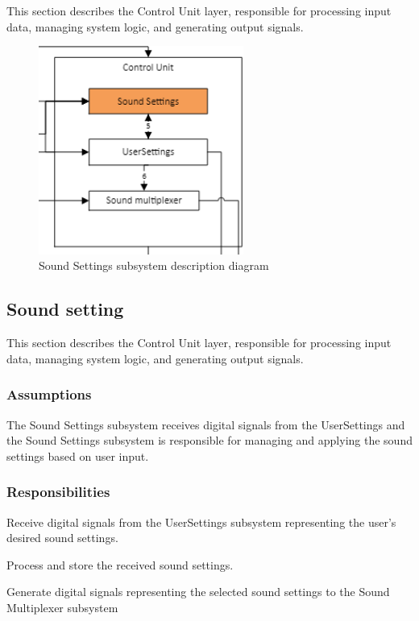 This section describes the Control Unit layer, responsible for processing input data, managing system logic, and generating output signals.
\begin{figure}[h!]
	\centering
 	\includegraphics[width=0.60\textwidth]{images/SoundSettings.png}
 \caption{Sound Settings subsystem description diagram}
\end{figure}
\subsection{Sound setting}
This section describes the Control Unit layer, responsible for processing input data, managing system logic, and generating output signals.


\subsubsection{Assumptions}
The Sound Settings subsystem receives digital signals from the UserSettings and the Sound Settings subsystem is responsible for managing and applying the sound settings based on user input.

\subsubsection{Responsibilities}
\begin{itemize}
\begin{item}
Receive digital signals from the UserSettings subsystem representing the user's desired sound settings.
\end{item}
\begin{item}
Process and store the received sound settings. 
\end{item}
\begin{item}
Generate digital signals representing the selected sound settings to the Sound Multiplexer subsystem 
\end{item}
\end{itemize}

